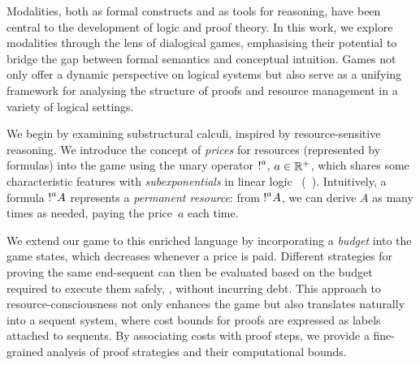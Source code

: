 

Modalities, both as formal constructs and as tools for reasoning, have been central to the development of logic and proof theory. In this work, we explore modalities through the lens of dialogical games, emphasising their potential to bridge the gap between formal semantics and conceptual intuition. Games not only offer a dynamic perspective on logical systems but also serve as a unifying framework for analysing the structure of proofs and resource management in a variety of logical settings.

We begin by examining substructural calculi, inspired by resource-sensitive reasoning. 
%
We introduce the concept of \emph{prices} for resources (represented by formulas) into the game using the unary operator $\hbox{$\mathop{!}^{a}$}$, $a \in \mathbb{R}^+$, which shares some characteristic features with \emph{subexponentials} in linear logic \LL\ (\SELL~\cite{DBLP:conf/kgc/DanosJS93,nigam09ppdp}). Intuitively, a formula $\hbox{$\mathop{!}^{a}$}A$ represents a \emph{permanent resource}: from $\hbox{$\mathop{!}^{a}$}A$, we can derive $A$ as many times as needed, paying the price~$a$ each time.

We extend our game to this enriched language by incorporating a \emph{budget} into the game states, which decreases whenever a price is paid. Different strategies for proving the same end-sequent can then be evaluated based on the budget required to execute them safely, \ie, without incurring debt. This approach to resource-consciousness not only enhances the game but also translates naturally into a sequent system, where cost bounds for proofs are expressed as labels attached to sequents. By associating costs with proof steps, we provide a fine-grained analysis of proof strategies and their computational bounds.

